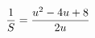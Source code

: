 \documentclass[preview]{standalone}
\begin{document}
\begin{align*}
\special{dvisvgm:raw <g id='unique000'>}\frac{1}{S}=\frac{u^2-4u+8}{2u}\special{dvisvgm:raw </g>}
\end{align*}
\end{document}
